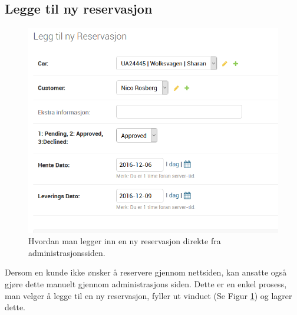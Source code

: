 \subsection*{Legge til ny reservasjon}




\begin{figure}[h!]
\begin{flushright}
\begin{minipage}{0.5\textwidth}
\begin{center}
    \includegraphics[width=1\textwidth]{Bilder/admin_ny_reservasjon.png}
    \caption[Ny reservasjon fra administrasjonsside]{Hvordan man legger inn en ny reservasjon direkte fra administrasjonssiden.}
    \label{fig:admin_new_res}
\end{center}
\end{minipage}
\end{flushright}
\end{figure}


%
\vspace{-7cm}
%
\begin{flushleft}
\begin{minipage}{0.5\textwidth}

%
%
Dersom en kunde ikke ønsker å reservere gjennom nettsiden, kan ansatte også gjøre dette manuelt gjennom administrasjons siden. Dette er en enkel prosess, man velger å legge til en ny reservasjon, fyller ut vinduet (Se Figur \ref{fig:admin_new_res}) og lagrer dette.

\end{minipage}
\end{flushleft}

